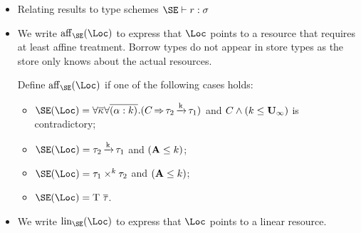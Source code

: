 \begin{itemize}
\begin{mathpar}


  \end{mathpar}
\item Relating results to type schemes $\SE \vdash r : \schm$
  \begin{mathpar}


  \end{mathpar}
\item
We write $\Affine\SE\Loc$ to express that $\Loc$ points to a resource
that requires at least affine treatment. Borrow types do not appear in
store types as the store only knows about the actual resources.

Define  $\Affine\SE\Loc$ if one of the following cases holds:
\begin{itemize}
\item $\SE (\Loc) =
  \forall\Multi\kvar\forall\Multi{\bvar{\tvar}{k}}.(\qual{C}{\tau_2\tarr{k}\tau_1})$
  and $C \wedge (k \lk \kun_\infty)$ is contradictory;
\item $\SE (\Loc) = \tau_2\tarr{k}{\tau_1}$ and $\Cleq{\kaff}{k}$;
\item $\SE (\Loc) = \tyPair[k]{\tau_1}{\tau_2}$ and $\Cleq \kaff
  k$;
\item $\SE (\Loc) = \tapp{\tcon}{\Multi\tau}$.
\end{itemize}
\item
We write $\Linear\SE\Loc$ to express that $\Loc$ points to a linear
resource.


\end{itemize}
